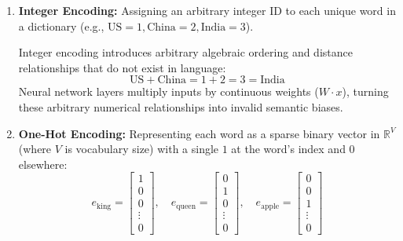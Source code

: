 \begin{enumerate}
    \item \textbf{Integer Encoding:} Assigning an arbitrary integer ID to each unique word in a dictionary (e.g., $\text{US} = 1, \text{China} = 2, \text{India} = 3$).
    
    \begin{propertybox}
    Integer encoding introduces arbitrary algebraic ordering and distance relationships that do not exist in language:
    \begin{equation}
    \text{US} + \text{China} = 1 + 2 = 3 = \text{India}
    \end{equation}
    Neural network layers multiply inputs by continuous weights ($W \cdot x$), turning these arbitrary numerical relationships into invalid semantic biases.
    \end{propertybox}

    \item \textbf{One-Hot Encoding:} Representing each word as a sparse binary vector in $\mathbb{R}^V$ (where $V$ is vocabulary size) with a single $1$ at the word's index and $0$ elsewhere:
    \begin{equation}
    e_{\text{king}} = \begin{bmatrix} 1 \\ 0 \\ 0 \\ \vdots \\ 0 \end{bmatrix}, \quad
    e_{\text{queen}} = \begin{bmatrix} 0 \\ 1 \\ 0 \\ \vdots \\ 0 \end{bmatrix}, \quad
    e_{\text{apple}} = \begin{bmatrix} 0 \\ 0 \\ 1 \\ \vdots \\ 0 \end{bmatrix}
    \end{equation}
\end{enumerate}

